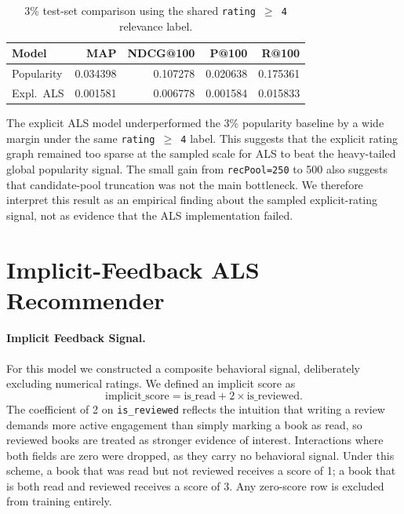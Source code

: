 \documentclass[10pt,twocolumn]{article}
\begin{document}
\begin{table}[!ht]
\centering
\caption{3\% test-set comparison using the shared \texttt{rating $\geq$ 4} relevance label.}
\label{tab:compare3pct}
\footnotesize
\setlength{\tabcolsep}{3pt}
\begin{tabular}{l r r r r}
\toprule
\textbf{Model} & \textbf{MAP} & \textbf{NDCG@100} & \textbf{P@100} & \textbf{R@100} \\
\midrule
Popularity & 0.034398 & 0.107278 & 0.020638 & 0.175361 \\
Expl.~ALS  & 0.001581 & 0.006778 & 0.001584 & 0.015833 \\
\bottomrule
\end{tabular}
\end{table}

The explicit ALS model underperformed the 3\% popularity baseline by a wide margin under the same \texttt{rating $\geq$ 4} label. This suggests that the explicit rating graph remained too sparse at the sampled scale for ALS to beat the heavy-tailed global popularity signal. The small gain from \texttt{recPool=250} to 500 also suggests that candidate-pool truncation was not the main bottleneck. We therefore interpret this result as an empirical finding about the sampled explicit-rating signal, not as evidence that the ALS implementation failed.

\section{Implicit-Feedback ALS Recommender}

\paragraph{Implicit Feedback Signal.} For this model we constructed a composite behavioral signal, deliberately excluding numerical ratings. We defined an implicit score as
\[
\text{implicit\_score} = \text{is\_read} + 2 \times \text{is\_reviewed}.
\]
The coefficient of 2 on \texttt{is\_reviewed} reflects the intuition that writing a review demands more active engagement than simply marking a book as read, so reviewed books are treated as stronger evidence of interest. Interactions where both fields are zero were dropped, as they carry no behavioral signal. Under this scheme, a book that was read but not reviewed receives a score of 1; a book that is both read and reviewed receives a score of 3. Any zero-score row is excluded from training entirely.
\end{document}
